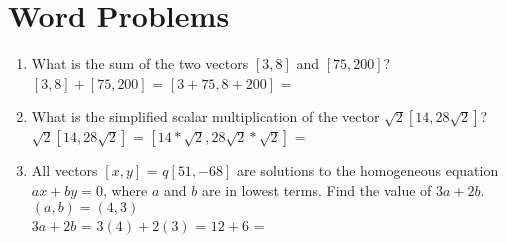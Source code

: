 \documentclass[11pt]{extarticle}
\begin{document}
\section{Word Problems}
\begin{enumerate}
    \itemsep2.5em
    \item What is the sum of the two vectors $[3, 8]$ and $[75, 200]$? \\ $[3, 8] + [75, 200]$ = $[3 + 75, 8 + 200]$ = \fbox{$[78, 208]$}
    \item What is the simplified scalar multiplication of the vector $\sqrt{2}[14, 28\sqrt{2}]$? \\ $\sqrt{2}[14, 28\sqrt{2}]$ = $[14 * \sqrt{2}, 28\sqrt{2} * \sqrt{2}]$ = \fbox{$[14\sqrt{2}, 56]$}
    \item All vectors $[x,y]$ = $q[51, -68]$ are solutions to the homogeneous equation $ax + by = 0$, where $a$ and $b$ are in lowest terms. Find the value of $3a + 2b$. \\ $(a, b) = (4, 3)$ \\ $3a + 2b$ = $3(4) + 2(3)$ = $12 + 6$ = 
\end{enumerate}
\end{document}
